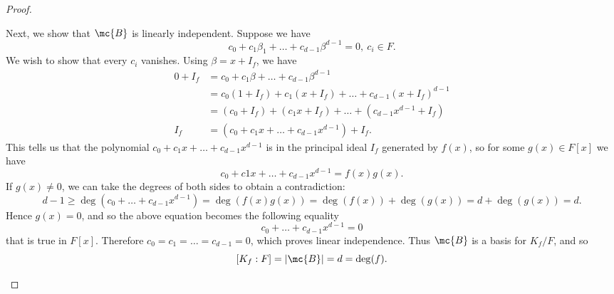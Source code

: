 \documentclass[math1530-lecture-notes]{subfiles}
\begin{document}
\begin{proof}[Proof]
\begin{enumerate}
      Next, we show that $\mc{B}$ is linearly independent. Suppose we have \[
        c_0+c_1\beta_1+\ldots+c_{d-1}\beta^{d-1}=0,\ c_i\in F
      .\] We wish to show that every $c_i$ vanishes. Using $\beta=x+I_f$, we have
      \begin{align*}
        0+I_f&= c_0+c_1\beta+\ldots+c_{d-1}\beta^{d-1} \\
             &= c_0(1+I_f)+c_1(x+I_f)+\ldots+c_{d-1}(x+I_f)^{d-1}\\
             &= (c_0+I_f)+(c_1x+I_f)+\ldots+(c_{d-1}x^{d-1}+I_f)\\
          I_f&= (c_0+c_1x+\ldots+c_{d-1}x^{d-1})+I_f
      .\end{align*}
      This tells us that the polynomial $c_0+c_1x+\ldots+c_{d-1}x^{d-1}$ is in the principal ideal
      $I_f$ generated by $f(x)$, so for some $g(x)\in F[x]$ we have \[
        c_0+c1x+\ldots+c_{d-1}x^{d-1}=f(x)g(x)
      .\] If $g(x)\neq 0$, we can take the degrees of both sides to obtain a contradiction: \[
      d-1 \ge \deg(c_0+\ldots+c_{d-1}x^{d-1})=\deg(f(x)g(x))=\deg(f(x))+\deg(g(x))=d+\deg(g(x))=d
    .\] Hence $g(x)=0$, and so the above equation becomes the following equality \[
      c_0+\ldots+c_{d-1}x^{d-1}=0
    \] that is true in $F[x]$. Therefore $c_0=c_1=\ldots=c_{d-1}=0$, which proves linear
    independence. Thus $\mc{B}$ is a basis for $K_f / F$, and so \[
      \left[K_f : F\right]=\left| \mc{B} \right| =d=\deg(f)
    .\] 
  \end{enumerate}
\end{proof}
\end{document}
